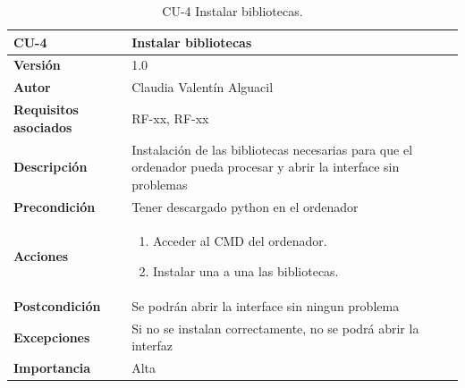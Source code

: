 \begin{table}[p]
	\centering
	\begin{tabularx}{\linewidth}{ p{} p{} }
		\toprule
		\textbf{CU-4} & \textbf{Instalar bibliotecas}\\
		\toprule
		\textbf{Versión}              & 1.0    \\
		\textbf{Autor}                & Claudia Valentín Alguacil \\
		\textbf{Requisitos asociados} & RF-xx, RF-xx \\
		\textbf{Descripción}          & Instalación de las bibliotecas necesarias para que el ordenador pueda procesar y abrir la interface sin problemas\\
		\textbf{Precondición}         & Tener descargado python en el ordenador \\
		\textbf{Acciones}             &
		\begin{enumerate}
			\def\labelenumi{\arabic{enumi}.}
			\tightlist
			\item Acceder al CMD del ordenador.
			\item Instalar una a una las bibliotecas.
		\end{enumerate}\\
		\textbf{Postcondición}        &  Se podrán abrir la interface sin ningun problema \\
		\textbf{Excepciones}          & Si no se instalan correctamente, no se podrá abrir la interfaz \\
		\textbf{Importancia}          & Alta \\
		\bottomrule
	\end{tabularx}
	\caption{CU-4 Instalar bibliotecas.}
\end{table}

